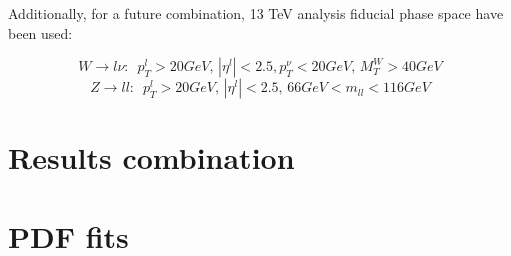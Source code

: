 Additionally, for a future combination, 13 TeV analysis fiducial phase space have been used:

\begin{equation}
W \to l \nu: \, \, \, p_T^l > 20 GeV, \, |\eta^l| < 2.5, p_T^{\nu} <20 GeV, \, M_T^W > 40 GeV
\end{equation}
\begin{equation}
Z \to ll: \, \, \, p_T^l > 20 GeV, \, |\eta^l| < 2.5, \, 66 GeV <m_{ll} < 116 GeV
\end{equation}

\section{Results combination}
\section{PDF fits}